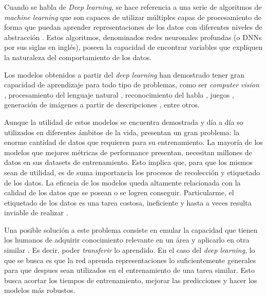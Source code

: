 Cuando se habla de {\it Deep learning}, se hace referencia a una serie de algoritmos de {\it machine learning} que son
capaces de utilizar m\'ultiples capas de procesamiento de forma que puedan aprender representaciones de los datos con
diferentes niveles de abstracci\'on \parencite{lecun2015deep}. Estos algoritmos, denominados redes neuronales profundas (o DNNs por sus siglas en ingl\'es),
poseen la capacidad de encontrar variables que expliquen la naturaleza del comportamiento de los datos.

Los modelos obtenidos a partir del {\it deep learning} han demostrado tener gran capacidad de aprendizaje para todo
tipo de problemas, como ser {\it computer vision} \parencite{szeliski2010computer, redmon2016yolo}, procesamiento del lenguaje natural \parencite{devlin2018bert}, reconocimiento del habla \parencite{hannun2014deep}, juegos \parencite{silver2016mastering}, generaci\'on de im\'agenes a partir de descripciones \parencite{ramesh2022dalle2}, entre otros.

Aunque la utilidad de estos modelos se encuentra demostrada y d\'ia a d\'ia so utilizados en diferentes \'ambitos de la
vida, presentan un gran problema: la enorme cantidad de datos que requieren para su entrenamiento. La mayor\'ia de los
modelos que mejores m\'etricas de performance presentan, necesitan millones de datos en sus datasets de entrenamiento.
Esto implica que, para que los mismos sean de utilidad, es de suma importancia los procesos de recolecci\'on y
etiquetado de los datos. La eficacia de los modelos queda altamente relacionada con la calidad de los datos que se
posean o se logren conseguir. Particularme, el etiquetado de los datos es una tarea costosa, ineficiente y hasta a
veces resulta inviable de realizar \parencite{reis2022data}.

Una posible soluci\'on a este problema consiste en emular la capacidad que tienen los humanos de adquirir conocimiento
relevante en un \'area y aplicarlo en otra similar \parencite{thrun1998learning}. Es decir, poder {\it transferir} lo aprendido. En el caso del {\it deep learning}, lo que se
busca es que la red aprenda representaciones lo suficientemente generales para que despues sean utilizados en el
entrenamiento de una tarea similar. Esto busca acortar los tiempos de entrenamiento, mejorar las predicciones y hacer
los modelos m\'as robustos.
